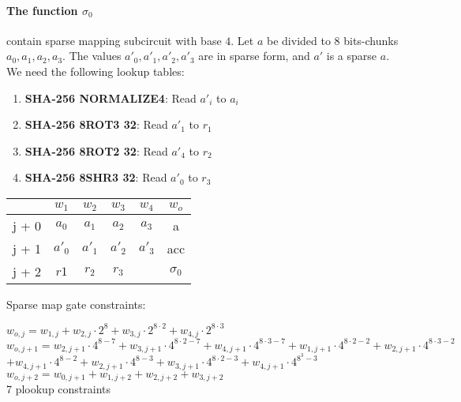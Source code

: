 \paragraph{The function $\sigma_0$} contain sparse mapping subcircuit with base $4$.
Let $a$ be divided to 8 bits-chunks $a_0, a_1, a_2, a_3$.
The values $a'_0, a'_1, a'_2, a'_3$ are in sparse form, and $a'$ is a sparse $a$.
We need the following lookup tables:
\begin{enumerate}
\item \textbf{SHA-256 NORMALIZE4}: Read $a'_i$ to $a_i$
\item \textbf{SHA-256 8ROT3 32}: Read $a'_1$ to $r_1$
\item \textbf{SHA-256 8ROT2 32}: Read $a'_4$ to $r_2$
\item \textbf{SHA-256 8SHR3 32}: Read $a'_0$ to $r_3$
\end{enumerate}
\begin{center}
\begin{tabular}{ c|c|c|c|c|c } 
  & $w_1$ & $w_2$ & $w_3$ & $w_4$ & $w_o$\\ 
 \hline
j + 0 & $a_0$ & $ a_1$ & $a_2$ & $a_3$ & a\\ 
j + 1 & $a'_0$ & $a'_1$ & $a'_2$ & $a'_3$ & acc \\
j + 2 & $r1 $& $r_2$ & $r_3$ &  & $\sigma_0$ \\ 
\end{tabular}
\end{center}
Sparse map gate constraints:
\begin{center}
$w_{o,j} = w_{1,j} + w_{2,j} \cdot 2^8 + w_{3,j} \cdot 2^{8 \cdot 2} + w_{4,j} \cdot 2^{8 \cdot 3}$ \\
$w_{o,j + 1} =  w_{2,j + 1} \cdot 4^{8 - 7} + w_{3,j + 1} \cdot 4^{8 \cdot 2 - 7} + w_{4,j + 1} \cdot 4^{8 \cdot 3 - 7}
	 	+ w_{1,j + 1} \cdot 4^{8 \cdot 2 - 2} + w_{2,j + 1} \cdot 4^{8 \cdot 3 - 2}$ \\
	 $+ w_{4,j + 1} \cdot 4^{8 - 2} + w_{2,j + 1} \cdot 4^{8 - 3} + w_{3,j + 1} \cdot 4^{8 \cdot 2 - 3}
	 	+ w_{4,j + 1} \cdot 4^{8^3 - 3}$ \\
$w_{o, j+2} = w_{0, j+1} + w_{1,j+2} + w_{2, j+2} + w_{3, j+2}$ \\
7 plookup constraints \\
\end{center}

